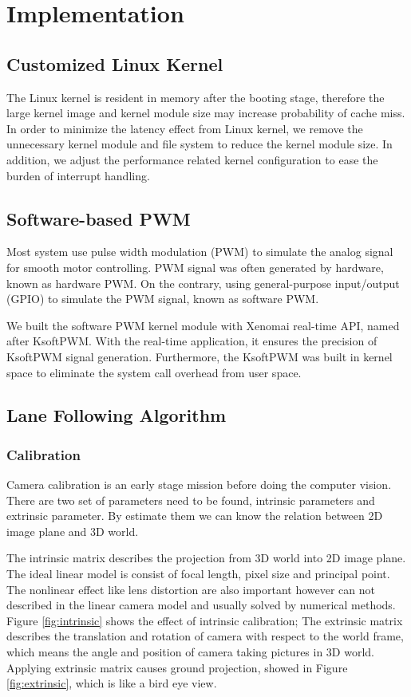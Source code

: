 \documentclass[conference]{IEEEtran}
\begin{document}
\section{Implementation}
\subsection{Customized Linux Kernel}

The Linux kernel is resident in memory after the booting stage, therefore the large kernel image and kernel module size may increase probability of cache miss. In order to minimize the latency effect from Linux kernel, we remove the unnecessary kernel module and file system to reduce the kernel module size. In addition, we adjust the performance related kernel configuration to ease the burden of interrupt handling.

\subsection{Software-based PWM}

Most system use pulse width modulation (PWM) to simulate the analog signal for smooth motor controlling. PWM signal was often generated by hardware, known as hardware PWM. On the contrary, using general-purpose input/output (GPIO) to simulate the PWM signal, known as software PWM.

We built the software PWM kernel module with Xenomai real-time API, named after KsoftPWM. With the real-time application, it ensures the precision of KsoftPWM signal generation. Furthermore, the KsoftPWM was built in kernel space to eliminate the system call overhead from user space.


\subsection{Lane Following Algorithm}

\subsubsection{Calibration}

Camera calibration is an early stage mission before doing the computer vision. There are two set of parameters need to be found, intrinsic parameters and extrinsic parameter. By estimate them we can know the relation between 2D image plane and 3D world.

The intrinsic matrix describes the projection from 3D world into 2D image plane. The ideal linear model is consist of focal length, pixel size and principal point. The nonlinear effect like lens distortion are also important however can not described in the linear camera model and usually solved by numerical methods. Figure \ref{fig:intrinsic} shows the effect of intrinsic calibration; The extrinsic matrix describes the translation and rotation of camera with respect to the world frame, which means the angle and position of camera taking pictures in 3D world. Applying extrinsic matrix causes ground projection, showed in Figure \ref{fig:extrinsic}, which is like a bird eye view.
\end{document}
